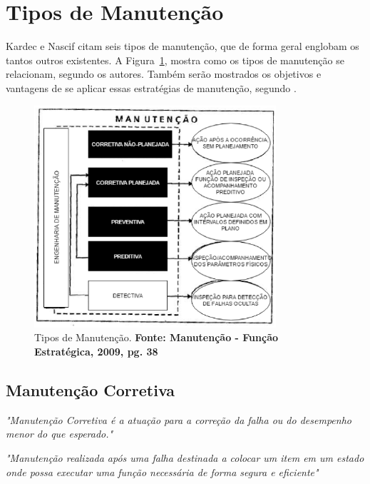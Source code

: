 \section{Tipos de Manutenção}
\label{tipos-man}


Kardec e Nascif citam seis tipos de manutenção, que de forma geral englobam os tantos outros existentes. A Figura~\ref{tiposmanutencao}, mostra como os tipos de manutenção se relacionam, segundo os autores. 
Também serão mostrados os objetivos e vantagens de se aplicar essas estratégias de manutenção, segundo \cite{pereira2011engenharia}.

\graphicspath{{figuras/}}
\begin{figure}[H]
\centering
\includegraphics[width=0.8\textwidth]{tipos-de-manutencao}
\caption{Tipos de Manutenção. \textbf{Fonte: Manutenção - Função Estratégica, 2009, pg. 38\hfill}}
\label{tiposmanutencao}
\end{figure}


\subsection{Manutenção Corretiva}

		\emph{"Manutenção Corretiva é a atuação para a correção da falha ou do desempenho menor do que esperado."} \cite{kardecnascif2010}

		\emph{"Manutenção realizada após uma falha destinada a colocar um item em um estado onde possa executar uma função necessária de forma segura e eficiente"} \cite{british1993bs}

